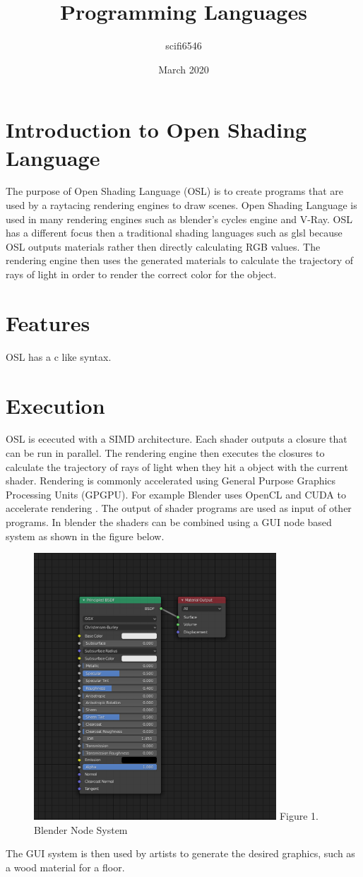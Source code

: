 \documentclass{article}
\title{Programming Languages}
\author{scifi6546 }
\date{March 2020}
\begin{document}
\maketitle

\section{Introduction to Open Shading Language}
The purpose of Open Shading Language (OSL) is to create programs that are used by a raytacing rendering engines to draw scenes. Open Shading Language is used in many rendering engines such as blender's cycles engine and V-Ray. OSL has a different focus then a traditional shading languages such as glsl because OSL outputs materials rather then directly calculating RGB values. The rendering engine then uses the generated materials to calculate the trajectory of rays of light in order to render the correct color for the object. 
\section{Features}
OSL has a c like syntax.
\section{Execution}
OSL is ececuted with a SIMD architecture. Each shader outputs a closure that can be run in parallel. The rendering engine then executes the closures to calculate the trajectory of rays of light when they hit a object with the current shader.  Rendering is commonly accelerated using General Purpose Graphics Processing Units (GPGPU). For example Blender uses OpenCL and CUDA to accelerate rendering \cite{blender_gpu}. The output of shader programs are used as input of other programs. In blender the shaders can be combined using a GUI node based system as shown in the figure below. \newline
\begin{figure}
  \includegraphics[height=10cm]{blender_nodes.png}\newline
  Figure 1. Blender Node System
  \centering
\end{figure}
\newline
The GUI system is then used by artists to generate the desired graphics, such as a wood material for a floor.
\end{document}

